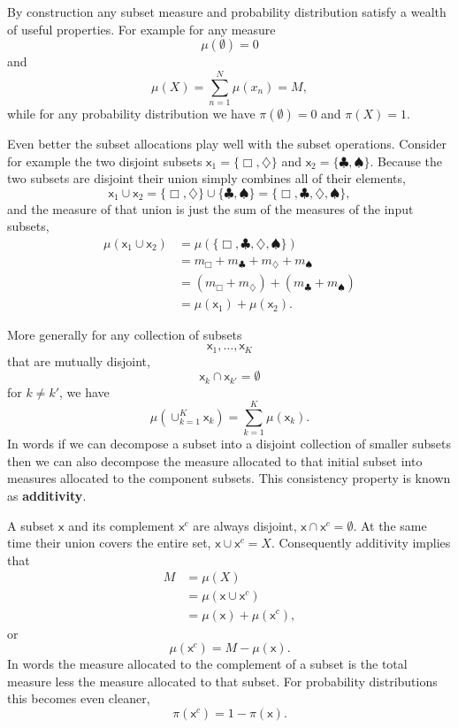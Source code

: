 \documentclass[
  letterpaper,
  DIV=11,
  numbers=noendperiod]{scrartcl}
\begin{document}
By construction any subset measure and probability distribution satisfy
a wealth of useful properties. For example for any measure \[
\mu( \emptyset ) = 0
\] and \[
\mu( X ) = \sum_{n = 1}^{N} \mu(x_{n}) = M,
\] while for any probability distribution we have
\(\pi( \emptyset ) = 0\) and \(\pi( X ) = 1\).

Even better the subset allocations play well with the subset operations.
Consider for example the two disjoint subsets
\(\mathsf{x}_{1} = \{ \Box, \diamondsuit \}\) and
\(\mathsf{x}_{2} = \{ \clubsuit, \spadesuit \}\). Because the two
subsets are disjoint their union simply combines all of their elements,
\[
\mathsf{x}_{1} \cup \mathsf{x}_{2}
=
\{ \Box, \diamondsuit \} \cup \{ \clubsuit, \spadesuit \}
=
\{ \Box, \clubsuit, \diamondsuit, \spadesuit \},
\] and the measure of that union is just the sum of the measures of the
input subsets, \begin{align*}
\mu ( \mathsf{x}_{1} \cup \mathsf{x}_{2} )
&=
\mu ( \{ \Box, \clubsuit, \diamondsuit, \spadesuit \} )
\\
&=
m_{\Box} + m_{\clubsuit} + m_{\diamondsuit} + m_{\spadesuit}
\\
&=
( m_{\Box} + m_{\diamondsuit} ) + ( m_{\clubsuit} + m_{\spadesuit} )
\\
&=
\mu( \mathsf{x}_{1} ) + \mu( \mathsf{x}_{2} ).
\end{align*}

More generally for any collection of subsets \[
\mathsf{x}_{1}, \ldots, \mathsf{x}_{K}
\] that are mutually disjoint, \[
\mathsf{x}_{k} \cap \mathsf{x}_{k'} = \emptyset
\] for \(k \ne k'\), we have \[
\mu ( \cup_{k = 1}^{K} \mathsf{x}_{k} )
=
\sum_{k = 1}^{K} \mu ( \mathsf{x}_{k} ).
\] In words if we can decompose a subset into a disjoint collection of
smaller subsets then we can also decompose the measure allocated to that
initial subset into measures allocated to the component subsets. This
consistency property is known as \textbf{additivity}.

A subset \(\mathsf{x}\) and its complement \(\mathsf{x}^{c}\) are always
disjoint, \(\mathsf{x} \cap \mathsf{x}^{c} = \emptyset\). At the same
time their union covers the entire set,
\(\mathsf{x} \cup \mathsf{x}^{c} = X\). Consequently additivity implies
that \begin{align*}
M
&=
\mu (X)
\\
&=
\mu ( \mathsf{x} \cup \mathsf{x}^{c} )
\\
&= \mu ( \mathsf{x} ) + \mu ( \mathsf{x}^{c} ),
\end{align*} or \[
\mu ( \mathsf{x}^{c} ) = M - \mu ( \mathsf{x} ).
\] In words the measure allocated to the complement of a subset is the
total measure less the measure allocated to that subset. For probability
distributions this becomes even cleaner, \[
\pi ( \mathsf{x}^{c} ) = 1 - \pi ( \mathsf{x} ).
\]
\end{document}
